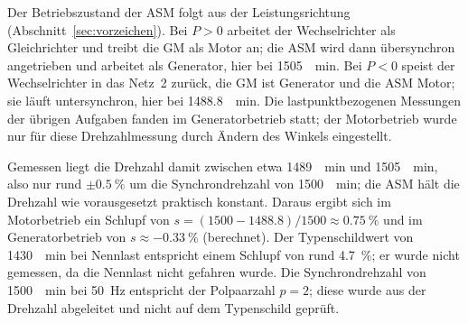 Der Betriebszustand der ASM folgt aus der Leistungsrichtung (Abschnitt~\ref{sec:vorzeichen}). Bei $P>0$ arbeitet der Wechselrichter als Gleichrichter und treibt die GM als Motor an; die ASM wird dann übersynchron angetrieben und arbeitet als Generator, hier bei \SI{1505}{\per\minute}. Bei $P<0$ speist der Wechselrichter in das Netz~2 zurück, die GM ist Generator und die ASM Motor; sie läuft untersynchron, hier bei \SI{1488.8}{\per\minute}. Die lastpunktbezogenen Messungen der übrigen Aufgaben fanden im Generatorbetrieb statt; der Motorbetrieb wurde nur für diese Drehzahlmessung durch Ändern des Winkels eingestellt.

Gemessen liegt die Drehzahl damit zwischen etwa \SI{1489}{\per\minute} und \SI{1505}{\per\minute}, also nur rund $\pm\SI{0.5}{\percent}$ um die Synchrondrehzahl von \SI{1500}{\per\minute}; die ASM hält die Drehzahl wie vorausgesetzt praktisch konstant. Daraus ergibt sich im Motorbetrieb ein Schlupf von $s=(1500-1488.8)/1500\approx\SI{0.75}{\percent}$ und im Generatorbetrieb von $s\approx\SI{-0.33}{\percent}$ (berechnet). Der Typenschildwert von \SI{1430}{\per\minute} bei Nennlast entspricht einem Schlupf von rund \SI{4.7}{\percent}; er wurde nicht gemessen, da die Nennlast nicht gefahren wurde. Die Synchrondrehzahl von \SI{1500}{\per\minute} bei \SI{50}{\hertz} entspricht der Polpaarzahl $p=2$; diese wurde aus der Drehzahl abgeleitet und nicht auf dem Typenschild geprüft.

